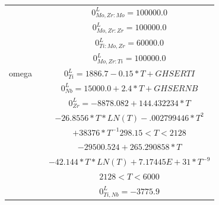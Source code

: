 \begin{longtable}[H]{ c c c }
                               & \cite{Perez2003}  & $0^\textit{L}_{Mo,Zr:Mo} = 100000.0$\\
                               & \cite{Perez2003}  & $0^\textit{L}_{Mo,Zr:Zr} = 100000.0$\\
                               & \cite{Kar2008} & $0^\textit{L}_{Ti:Mo,Zr} = 60000.0$\\
                               & \cite{Kar2008} & $0^\textit{L}_{Mo,Zr:Ti} = 100000.0$\\
                  omega & \cite{Zhang2001} & $0^\textit{L}_{Ti} = 1886.7-0.15*T+GHSERTI$\\
                               & \cite{Zhang2001} &$0^\textit{L}_{Nb} = 15000.0+2.4*T+GHSERNB$\\
                               & \cite{Dinsdale1991} & $0^\textit{L}_{Zr} = -8878.082+144.432234*T$\\
                               &                               & $-26.8556*T*LN(T)-.002799446*T^{2}$\\                      
                               &      & $+38376*T^{-1}    298.15 < T < 2128$\\
                               &      & $-29500.524+265.290858*T$\\
                               &      & $-42.144*T*LN(T)+7.17445E+31*T^{-9}$\\          
                               &      &  $2128 < T< 6000$\\
                               & \cite{Zhang2001} & $0^\textit{L}_{Ti,Nb} = -3775.9$\\
\end{longtable}



